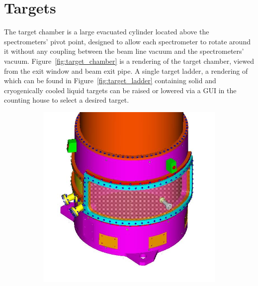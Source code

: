 \section{Targets}
The target chamber is a large evacuated cylinder located above the
spectrometers' pivot point, designed to allow each spectrometer to rotate
around it without any coupling between the beam line vacuum and the
spectrometers' vacuum.
Figure~\ref{fig:target_chamber} is a rendering of the target chamber, viewed
from the exit window and beam exit pipe.
A single target ladder, a rendering of which can be found in
Figure~\ref{fig:target_ladder} containing solid and cryogenically cooled liquid
targets can be raised or lowered via a GUI in the counting house to select a
desired target.

\begin{figure}[h]
    \centering
    \begin{subfigure}[b]{0.4\textwidth}
        \centering
        \includegraphics[width=\textwidth]{chap3/target_chamber.jpg}
        \label{fig:target_chamber1}
    \end{subfigure}
    \begin{subfigure}[b]{0.4\textwidth}
        \centering

\end{subfigure}
\end{figure}
